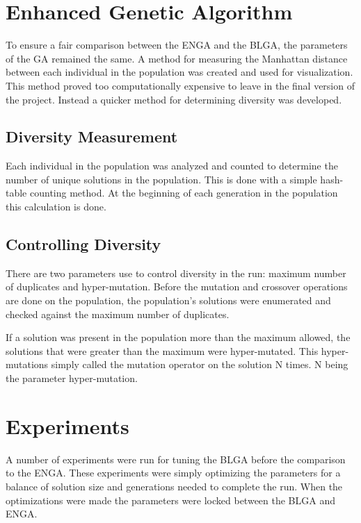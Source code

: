 \documentclass[]{article}
\begin{document}
\section{Enhanced Genetic Algorithm}\label{enhanced-genetic-algorithm}

To ensure a fair comparison between the ENGA and the BLGA, the
parameters of the GA remained the same. A method for measuring the
Manhattan distance between each individual in the population was created
and used for visualization. This method proved too computationally
expensive to leave in the final version of the project. Instead a
quicker method for determining diversity was developed.

\subsection{Diversity Measurement}\label{diversity-measurement}

Each individual in the population was analyzed and counted to determine
the number of unique solutions in the population. This is done with a
simple hash-table counting method. At the beginning of each generation
in the population this calculation is done.

\subsection{Controlling Diversity}\label{controlling-diversity}

There are two parameters use to control diversity in the run: maximum
number of duplicates and hyper-mutation. Before the mutation and
crossover operations are done on the population, the population's
solutions were enumerated and checked against the maximum number of
duplicates.

If a solution was present in the population more than the maximum
allowed, the solutions that were greater than the maximum were
hyper-mutated. This hyper-mutations simply called the mutation operator
on the solution N times. N being the parameter hyper-mutation.

\section{Experiments}\label{experiments}

A number of experiments were run for tuning the BLGA before the
comparison to the ENGA. These experiments were simply optimizing the
parameters for a balance of solution size and generations needed to
complete the run. When the optimizations were made the parameters were
locked between the BLGA and ENGA.
\end{document}
